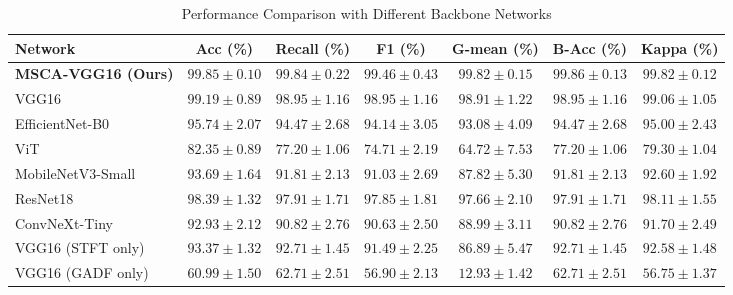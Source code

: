 \documentclass[pdflatex,sn-mathphys-num]{sn-jnl}
\theoremstyle{thmstyleone}%
\theoremstyle{thmstyletwo}%
\theoremstyle{thmstylethree}%
\begin{document}
\begin{table}
    \caption{Performance Comparison with Different Backbone Networks\label{tab:network_comparison}}
    \centering
    \renewcommand{\arraystretch}{1.15}
    \small
    \begin{tabular}{lcccccc}
        \toprule
        \textbf{Network} & \textbf{Acc (\%)} & \textbf{Recall (\%)} & \textbf{F1 (\%)} & \textbf{G-mean (\%)} & \textbf{B-Acc (\%)} & \textbf{Kappa (\%)} \\
        \midrule
        \textbf{MSCA-VGG16 (Ours)} & $\mathbf{99.85 \pm 0.10}$ & $\mathbf{99.84 \pm 0.22}$ & $\mathbf{99.46 \pm 0.43}$ & $\mathbf{99.82 \pm 0.15}$ & $\mathbf{99.86 \pm 0.13}$ & $\mathbf{99.82 \pm 0.12}$ \\
        VGG16~\cite{9440949} & $99.19 \pm 0.89$ & $98.95 \pm 1.16$ & $98.95 \pm 1.16$ & $98.91 \pm 1.22$ & $98.95 \pm 1.16$ & $99.06 \pm 1.05$ \\
        EfficientNet-B0~\cite{11028059}& $95.74 \pm 2.07$ & $94.47 \pm 2.68$ & $94.14 \pm 3.05$ & $93.08 \pm 4.09$ & $94.47 \pm 2.68$ & $95.00 \pm 2.43$ \\
        ViT~\cite{10663388} & $82.35 \pm 0.89$ & $77.20 \pm 1.06$ & $74.71 \pm 2.19$ & $64.72 \pm 7.53$ & $77.20 \pm 1.06$ & $79.30 \pm 1.04$ \\
        MobileNetV3-Small~\cite{ZHANG2026106301}& $93.69 \pm 1.64$ & $91.81 \pm 2.13$ & $91.03 \pm 2.69$ & $87.82 \pm 5.30$ & $91.81 \pm 2.13$ & $92.60 \pm 1.92$ \\
        ResNet18~\cite{MIAO2022108116}& $ 98.39\pm 1.32$ & $97.91 \pm 1.71$ & $97.85 \pm1.81 $ & $ 97.66 \pm 2.10$ & $ 97.91\pm 1.71$ & $ 98.11\pm 1.55$ \\
        ConvNeXt-Tiny~\cite{10929672}& $92.93 \pm 2.12$ & $90.82 \pm 2.76$ & $90.63 \pm 2.50$ & $88.99 \pm 3.11$ & $90.82 \pm 2.76$ & $91.70 \pm 2.49$ \\
        \midrule
        VGG16 (STFT only)~\cite{9440949} & $93.37\pm 1.32$ & $92.71 \pm1.45 $ & $91.49 \pm 2.25$ & $86.89\pm 5.47$ & $ 92.71\pm1.45 $ & $92.58\pm 1.48$ \\
        VGG16 (GADF only)~\cite{9440949} & $60.99\pm 1.50$ & $ 62.71\pm 2.51$ & $ 56.90\pm 2.13$ & $ 12.93\pm 1.42$ & $ 62.71\pm 2.51$ & $ 56.75\pm 1.37$ \\
        \bottomrule
    \end{tabular}

    \vspace{6mm}


\end{table}
\end{document}
